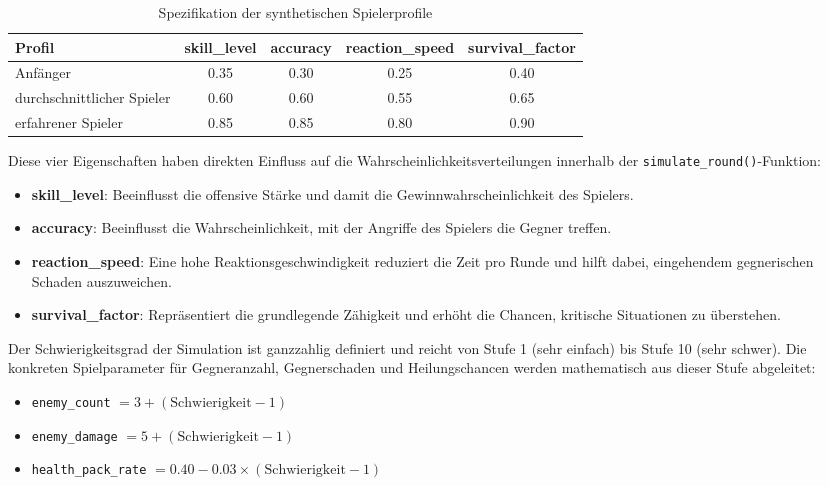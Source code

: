 \documentclass[11pt,a4paper]{article}
\begin{document}
\begin{table}[H]
    \centering
    \begin{tabular}{lcccc}
    \toprule
    \textbf{Profil} & \textbf{skill\_level} & \textbf{accuracy} & \textbf{reaction\_speed} & \textbf{survival\_factor} \\
    \midrule
    Anfänger & 0.35 & 0.30 & 0.25 & 0.40 \\
    durchschnittlicher Spieler & 0.60 & 0.60 & 0.55 & 0.65 \\
    erfahrener Spieler & 0.85 & 0.85 & 0.80 & 0.90 \\
    \bottomrule
    \end{tabular}
    \caption{Spezifikation der synthetischen Spielerprofile}
\end{table}

Diese vier Eigenschaften haben direkten Einfluss auf die Wahrscheinlichkeitsverteilungen innerhalb der \texttt{simulate\_round()}-Funktion:
\begin{itemize}
    \item \textbf{skill\_level}: Beeinflusst die offensive Stärke und damit die Gewinnwahrscheinlichkeit des Spielers.
    \item \textbf{accuracy}: Beeinflusst die Wahrscheinlichkeit, mit der Angriffe des Spielers die Gegner treffen.
    \item \textbf{reaction\_speed}: Eine hohe Reaktionsgeschwindigkeit reduziert die Zeit pro Runde und hilft dabei, eingehendem gegnerischen Schaden auszuweichen.
    \item \textbf{survival\_factor}: Repräsentiert die grundlegende Zähigkeit und erhöht die Chancen, kritische Situationen zu überstehen.
\end{itemize}

Der Schwierigkeitsgrad der Simulation ist ganzzahlig definiert und reicht von Stufe 1 (sehr einfach) bis Stufe 10 (sehr schwer). Die konkreten Spielparameter für Gegneranzahl, Gegnerschaden und Heilungschancen werden mathematisch aus dieser Stufe abgeleitet:

\begin{itemize}
    \item \texttt{enemy\_count} $= 3 + (\mathrm{Schwierigkeit} - 1)$
    \item \texttt{enemy\_damage} $= 5 + (\mathrm{Schwierigkeit} - 1)$
    \item \texttt{health\_pack\_rate} $= 0.40 - 0.03 \times (\mathrm{Schwierigkeit} - 1)$
\end{itemize}
\end{document}
